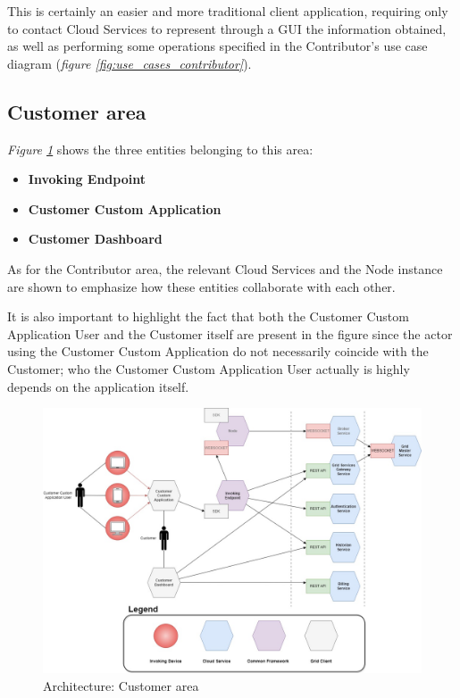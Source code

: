 This is certainly an easier and more traditional client application, requiring only to contact Cloud Services to represent through a GUI the information obtained, as well as performing some operations specified in the Contributor's use case diagram (\textit{figure \ref{fig:use_cases_contributor}}). 

\subsection{Customer area}\label{customer_area}
\textit{Figure \ref{fig:architecture_customer}} shows the three entities belonging to this area:
\begin{itemize}
    \item \textbf{Invoking Endpoint}
    \item \textbf{Customer Custom Application}
    \item \textbf{Customer Dashboard}
\end{itemize}
As for the Contributor area, the relevant Cloud Services and the Node instance are shown to emphasize how these entities collaborate with each other.

It is also important to highlight the fact that both the Customer Custom Application User and the Customer itself are present in the figure since the actor using the Customer Custom Application do not necessarily coincide with the Customer; who the Customer Custom Application User actually is highly depends on the application itself.
\vspace{8mm}

\begin{figure}[!ht]
    \centering
    \includegraphics[width=\linewidth]{document/chapters/chapter_6/images/architecture_customer.jpg}
    \caption{Architecture: Customer area}
    \label{fig:architecture_customer}
\end{figure}

